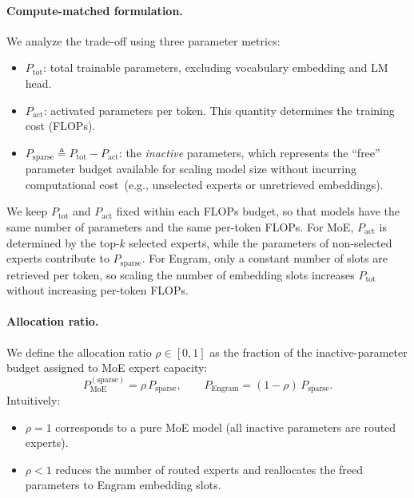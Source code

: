 \paragraph{Compute-matched formulation.}
We analyze the trade-off using three parameter metrics:
\begin{itemize}[leftmargin=*,itemsep=2pt,topsep=2pt]
    \item $P_{\mathrm{tot}}$: total trainable parameters, excluding vocabulary embedding and LM head.
    \item $P_{\mathrm{act}}$: activated parameters per token. This quantity determines the training cost (FLOPs).
    \item $P_{\mathrm{sparse}} \triangleq P_{\mathrm{tot}} - P_{\mathrm{act}}$: the \textit{inactive} parameters, which represents the ``free'' parameter budget available for scaling model size without incurring computational cost~(e.g., unselected experts or unretrieved embeddings).
\end{itemize}
We keep $P_{\mathrm{tot}}$ and $P_{\mathrm{act}}$ fixed within each FLOPs budget, so that models have the same number of parameters and the same per-token FLOPs. For MoE, $P_{\mathrm{act}}$ is determined by the top-$k$ selected experts, while the parameters of non-selected experts contribute to $P_{\mathrm{sparse}}$. For Engram, only a constant number of slots are retrieved per token, so scaling the number of embedding slots increases $P_{\mathrm{tot}}$ without increasing per-token FLOPs.


\paragraph{Allocation ratio.}
We define the allocation ratio $\rho\in[0,1]$ as the fraction of the inactive-parameter budget assigned to MoE expert capacity:
\begin{equation}
P_{\mathrm{MoE}}^{(\mathrm{sparse
})} = \rho\, P_{\mathrm{sparse}}, 
\qquad
P_{\mathrm{Engram}} = (1-\rho)\, P_{\mathrm{sparse}}.
\end{equation}
Intuitively:
\begin{itemize}[leftmargin=*,itemsep=2pt,topsep=2pt]
    \item $\rho=1$ corresponds to a pure MoE model (all inactive parameters are routed experts).
    \item $\rho<1$ reduces the number of routed experts and reallocates the freed parameters to Engram embedding slots.
\end{itemize}

